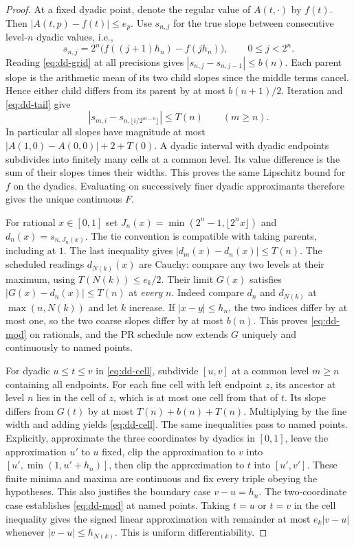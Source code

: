 \begin{proof}
At a fixed dyadic point, denote the regular value of $A(t,\cdot)$ by $f(t)$. Then $|A(t,p)-f(t)|\le e_p$. Use $s_{n,j}$ for the true slope between consecutive level-$n$ dyadic values, i.e.,
\[
 s_{n,j}=2^n\bigl(f((j+1)h_n)-f(jh_n)\bigr),\qquad 0\le j<2^n .
\]
Reading \eqref{eq:dd-grid} at all precisions gives $|s_{n,j}-s_{n,j-1}|\le b(n)$. Each parent slope is the arithmetic mean of its two child slopes since the middle terms cancel. Hence either child differs from its parent by at most $b(n+1)/2$. Iteration and \eqref{eq:dd-tail} give
\[
 |s_{m,i}-s_{n,\lfloor i/2^{m-n}\rfloor}|\le T(n)
 \qquad (m\ge n).
\]
In particular all slopes have magnitude at most
$|A(1,0)-A(0,0)|+2+T(0)$. A dyadic interval with dyadic endpoints subdivides into finitely many cells at a common level. Its value difference is the sum of their slopes times their widths. This proves the same Lipschitz bound for $f$ on the dyadics. Evaluating on successively finer dyadic approximants therefore gives the unique continuous $F$.

For rational $x\in[0,1]$ set $J_n(x)=\min(2^n-1,\lfloor 2^nx\rfloor)$ and $d_n(x)=s_{n,J_n(x)}$. The tie convention is compatible with taking parents, including at $1$. The last inequality gives $|d_m(x)-d_n(x)|\le T(n)$. The scheduled readings $d_{N(k)}(x)$ are Cauchy: compare any two levels at their maximum, using $T(N(k))\le e_k/2$. Their limit $G(x)$ satisfies $|G(x)-d_n(x)|\le T(n)$ at \emph{every} $n$. Indeed compare $d_n$ and $d_{N(k)}$ at $\max(n,N(k))$ and let $k$ increase. If $|x-y|\le h_n$, the two indices differ by at most one, so the two coarse slopes differ by at most $b(n)$. This proves \eqref{eq:dd-mod} on rationals, and the PR schedule now extends $G$ uniquely and continuously to named points.

For dyadic $u\le t\le v$ in \eqref{eq:dd-cell}, subdivide $[u,v]$ at a common level $m\ge n$ containing all endpoints. For each fine cell with left endpoint $z$, its ancestor at level $n$ lies in the cell of $z$, which is at most one cell from that of $t$. Its slope differs from $G(t)$ by at most $T(n)+b(n)+T(n)$. Multiplying by the fine width and adding yields \eqref{eq:dd-cell}. The same inequalities pass to named points. Explicitly, approximate the three coordinates by dyadics in $[0,1]$, leave the approximation $u'$ to $u$ fixed, clip the approximation to $v$ into $[u',\min(1,u'+h_n)]$, then clip the approximation to $t$ into $[u',v']$. These finite minima and maxima are continuous and fix every triple obeying the hypotheses. This also justifies the boundary case $v-u=h_n$. The two-coordinate case establishes \eqref{eq:dd-mod} at named points. Taking $t=u$ or $t=v$ in the cell inequality gives the signed linear approximation with remainder at most $e_k|v-u|$ whenever $|v-u|\le h_{N(k)}$. This is uniform differentiability.


\end{proof}
